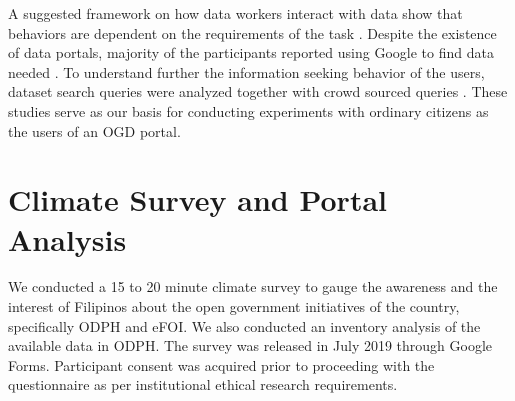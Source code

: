 \documentclass{sigchi}
\begin{document}
A suggested framework on how data workers interact with data show that behaviors are dependent on the requirements of the task \cite{koesten2017trials}. Despite the existence of data portals, majority of the participants reported using Google to find data needed \cite{koesten2017trials}. To understand further the information seeking behavior of the users, dataset search queries were analyzed together with crowd sourced queries \cite{kacprzak2019characterising}. These studies serve as our basis for conducting experiments with ordinary citizens as the users of an OGD portal. 

\begin{comment}
Collaborative work using OGD was found to be interdisciplinary in nature \cite{choi2017characteristics}. Even though the focus of our study is not on collaborative data work, it is worth noting that the typical projects that emerge from OGD are statistical analysis and exploratory data tools that allow end users to examine data on their own \cite{choi2017characteristics}. 
\end{comment}

\begin{comment}
We conducted a climate survey to gauge the awareness and the interest of Filipino citizens about open government data. We also conducted a pilot study to evaluate the usability of the Open Data Philippines and Freedom of Information portals through search tasks. The survey was distributed electronically through snowball sampling on July 2019 while the usability interviews were conducted between July to August 2019 around the areas of Metro Manila. We obtained participant consent as per research ethics requirements to be able to conduct this study.
\end{comment}

\section{Climate Survey and Portal Analysis}
We conducted a 15 to 20 minute climate survey to gauge the awareness and the interest of Filipinos about the open government initiatives of the country, specifically ODPH and eFOI. We also conducted an inventory analysis of the available data in ODPH. The survey was released in July 2019 through Google Forms. Participant consent was acquired prior to proceeding with the questionnaire as per institutional ethical research requirements.
\end{document}
